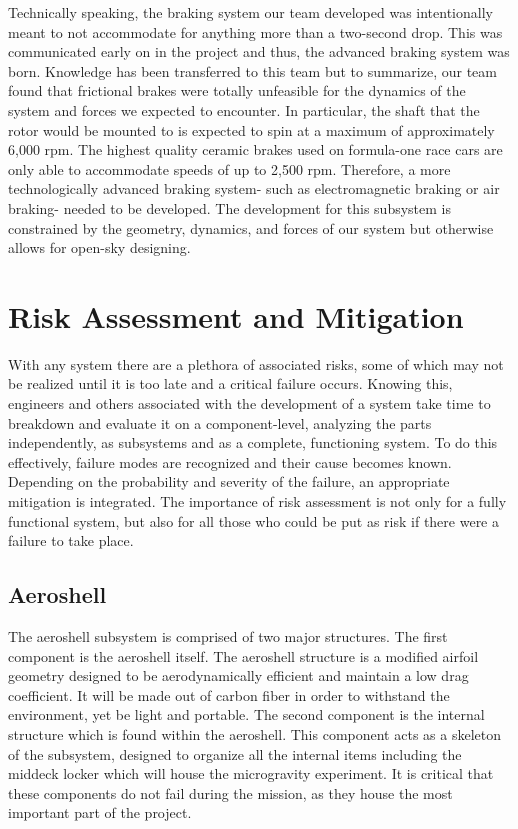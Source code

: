 Technically speaking, the braking system our team developed was intentionally meant to not accommodate for anything more than a two-second drop. This was communicated early on in the project and thus, the advanced braking system was born. Knowledge has been transferred to this team but to summarize, our team found that frictional brakes were totally unfeasible for the dynamics of the system and forces we expected to encounter. In particular, the shaft that the rotor would be mounted to is expected to spin at a maximum of approximately 6,000 rpm. The highest quality ceramic brakes used on formula-one race cars are only able to accommodate speeds of up to 2,500 rpm. Therefore, a more technologically advanced braking system- such as electromagnetic braking or air braking- needed to be developed. The development for this subsystem is constrained by the geometry, dynamics, and forces of our system but otherwise allows for open-sky designing. 

\section{Risk Assessment and Mitigation}

\indent\indent With any system there are a plethora of associated risks, some of which may not be realized until it is too late and a critical failure occurs. Knowing this, engineers and others associated with the development of a system take time to breakdown and evaluate it on a component-level, analyzing the parts independently, as subsystems and as a complete, functioning system. To do this effectively, failure modes are recognized and their cause becomes known. Depending on the probability and severity of the failure, an appropriate mitigation is integrated. The importance of risk assessment is not only for a fully functional system, but also for all those who could be put as risk if there were a failure to take place.


\subsection{Aeroshell}

\indent\indent The aeroshell subsystem is comprised of two major structures. The first component is the aeroshell itself. The aeroshell structure is a modified airfoil geometry designed to be aerodynamically efficient and maintain a low drag coefficient. It will be made out of carbon fiber in order to withstand the environment, yet be light and portable. The second component is the internal structure which is found within the aeroshell. This component acts as a skeleton of the subsystem, designed to organize all the internal items including the middeck locker which will house the microgravity experiment. It is critical that these components do not fail during the mission, as they house the most important part of the project.

